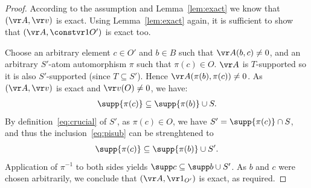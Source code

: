 \begin{proof}
According to the assumption and Lemma~\ref{lem:exact} we know that
$(\vr A, \vr v)$ is exact. 
Using Lemma~\ref{lem:exact} again, it is sufficient to show that $(\vr A, \constvr 1 {O'})$ is exact too.


Choose an arbitrary element $c\in O'$ and $b\in B$ such that $\vr A (b,c)\neq 0$, and an arbitrary
$S'$-atom automorphism $\pi$ such that $\pi(c)\in O$.
$\vr A$ is $T$-supported so it is also $S'$-supported (since $T\subseteq S'$).
Hence $\vr A (\pi(b), \pi(c))\neq 0$.
As $(\vr A, \vr v)$ is exact and $\vr v(O)\neq 0$, we have:
\begin{align}\label{eq:pisub}
\supp{\pi(c)}\subseteq \supp{\pi(b)}\cup S. 
\end{align}
By definition~\eqref{eq:crucial} of $S'$, as $\pi(c)\in O$, we have
$S'=\supp{\pi(c)}\cap S$, and thus the inclusion~\eqref{eq:pisub} can be strenghtened to
\[
\supp{\pi(c)}\subseteq \supp{\pi(b)}\cup S'.
\]
Application of $\pi^{-1}$ to both sides yields $\supp c \subseteq \supp b\cup S'$. 
As $b$ and $c$ were chosen arbitrarily, we conclude that
$(\vr A, \vr 1_{O'})$ is exact, as required.
%
%
%
%
%

\end{proof}
